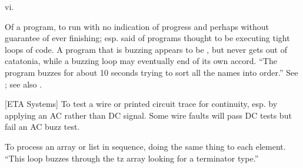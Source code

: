  vi.

\begin{inparaenum}
\item Of a program, to run with no indication of progress and perhaps without
    guarantee of ever finishing; esp. said of programs thought to be executing
    tight loops of code. A program that is buzzing appears to be
    , but never gets out of catatonia, while a buzzing loop
    may eventually end of its own accord. ``The program buzzes for about 10
    seconds trying to sort all the names into order.'' See ; see
    also .
\item {[}ETA Systems] To test a wire or printed circuit trace for continuity,
    esp. by applying an AC rather than DC signal. Some wire faults will pass DC
    tests but fail an AC buzz test.
\item To process an array or list in sequence, doing the same thing to each
    element. ``This loop buzzes through the tz array looking for a terminator
    type.''
\end{inparaenum}

